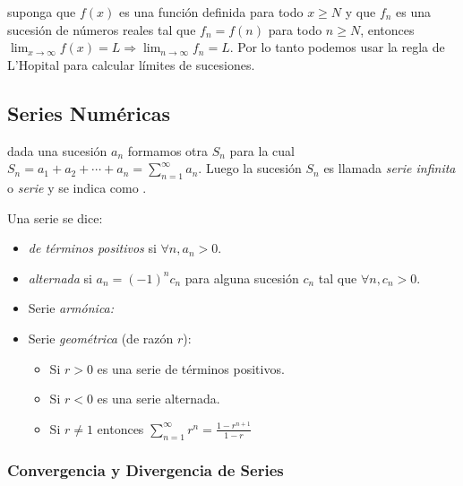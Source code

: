 \Teorema suponga que \(f(x)\) es una función definida para todo
\(x \geq N\) y que \(f_n\) es una sucesión de números reales tal que
\(f_n = f(n)\) para todo \(n \geq N\), entonces
\(\ensuremath{\lim_{x \to \infty} f(x)} = L \Rightarrow \ensuremath{\lim_{n \to \infty} f_n} = L\).
Por lo tanto podemos usar la regla de L'Hopital para calcular límites de
sucesiones.

\hypertarget{series-numuxe9ricas}{%
\subsection{Series Numéricas}\label{series-numuxe9ricas}}

\Definicion dada una sucesión \(a_n\) formamos otra \(S_n\) para la cual
\(S_n = a_1 + a_2 + \cdots + a_n = \ensuremath{\sum_{n=1}^\infty a_n}\).
Luego la sucesión \(S_n\) es llamada \emph{serie infinita} o
\emph{serie} y se indica como .

Una serie  se dice:

\begin{itemize}
\tightlist
\item
  \emph{de términos positivos} si \(\forall n, a_n > 0\).
\item
  \emph{alternada} si \(a_n = (-1)^n c_n\) para alguna sucesión \(c_n\)
  tal que \(\forall n, c_n > 0\).
\end{itemize}

\Ejemplo

\begin{itemize}
\tightlist
\item
  Serie \emph{armónica:} 
\item
  Serie \emph{geométrica} (de razón \(r\)): 

  \begin{itemize}
  \tightlist
  \item
    Si \(r > 0\) es una serie de términos positivos.
  \item
    Si \(r < 0\) es una serie alternada.
  \item
    Si \(r \neq 1\) entonces
    \(\ensuremath{\sum_{n=1}^\infty r^n} = \frac{1 - r^{n+1}}{1 - r}\)
  \end{itemize}
\end{itemize}

\hypertarget{convergencia-y-divergencia-de-series}{%
\subsubsection{Convergencia y Divergencia de
Series}\label{convergencia-y-divergencia-de-series}}

